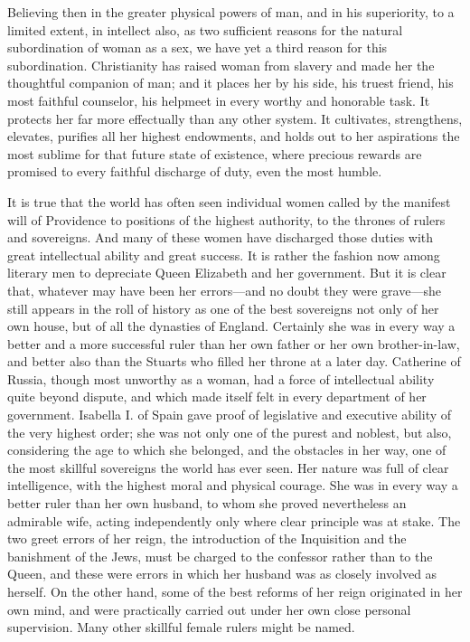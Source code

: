 \begin{linenumbers*}
\indent Believing then in the greater physical powers of man, and in his superiority, to a limited extent, in intellect also, as two sufficient reasons for the natural subordination of woman as a sex, we have yet a third reason for this subordination. Christianity has raised woman from slavery and made her the thoughtful companion of man; and it places her by his side, his truest friend, his most faithful counselor, his helpmeet in every worthy and honorable task. It protects her far more effectually than any other system. It cultivates, strengthens, elevates, purifies all her highest endowments, and holds out to her aspirations the most sublime for that future state of existence, where precious rewards are promised to every faithful discharge of duty, even the most humble.

\indent It is true that the world has often seen individual women called by the manifest will of Providence to positions of the highest authority, to the thrones of rulers and sovereigns. And many of these women have discharged those duties with great intellectual ability and great success. It is rather the fashion now among literary men to depreciate Queen Elizabeth and her government. But it is clear that, whatever may have been her errors—and no doubt they were grave—she still appears in the roll of history as one of the best sovereigns not only of her own house, but of all the dynasties of England. Certainly she was in every way a better and a more successful ruler than her own father or her own brother-in-law, and better also than the Stuarts who filled her throne at a later day. Catherine of Russia, though most unworthy as a woman, had a force of intellectual ability quite beyond dispute, and which made itself felt in every department of her government. Isabella I. of Spain gave proof of legislative and executive ability of the very highest order; she was not only one of the purest and noblest, but also, considering the age to which she belonged, and the obstacles in her way, one of the most skillful sovereigns the world has ever seen. Her nature was full of clear intelligence, with the highest moral and physical courage. She was in every way a better ruler than her own husband, to whom she proved nevertheless an admirable wife, acting independently only where clear principle was at stake. The two greet errors of her reign, the introduction of the Inquisition and the banishment of the Jews, must be charged to the confessor rather than to the Queen, and these were errors in which her husband was as closely involved as herself. On the other hand, some of the best reforms of her reign originated in her own mind, and were practically carried out under her own close personal supervision. Many other skillful female rulers might be named.


\end{linenumbers*}
